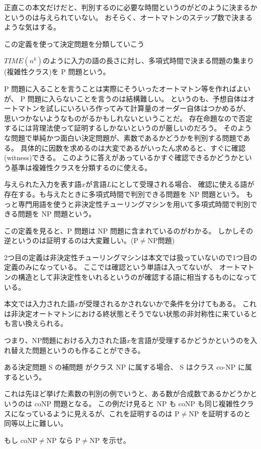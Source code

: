 \documentclass[../../master.tex]{subfiles}
\begin{document}
正直この本文だけだと、判別するのに必要な時間というのがどのように決まるかというのは与えられていない。
おそらく、オートマトンのステップ数で決まるような気はする。

この定義を使って決定問題を分類していこう
\begin{tcolorbox}[title = P 問題]
    \(TIME(n^k)\)のように入力の語の長さに対し、多項式時間で決まる問題の集まり(複雑性クラス)を P 問題という。
\end{tcolorbox}

P 問題に入ることを言うことは実際にそういったオートマトン等を作ればよいが、
P 問題に入らないことを言うのは結構難しい。
というのも、予想自体はオートマトンを試しにいろいろ作ってみて計算量のオーダー自体はつかめるが、
思いつかないようなものがるかもしれないということだ。
存在命題なので否定するには背理法使って証明するしかないというのが厳しいのだろう。
そのような問題で単純かつ面白い決定問題が、素数であるかどうかを判別する問題である。
具体的に因数を求めるのは大変であるがいったん求めると、すぐに確認(witness)できる。
このように答えがあっているかすぐ確認できるかどうかという基準は複雑性クラスを分類するのに使える。

\begin{tcolorbox}[title = NP 問題]
    与えられた入力を表す語\(x\)が言語\(L\)にとして受理される場合、
    確認に使える語が存在する。も与えたときに多項式時間で判別できる問題を NP 問題という。
    もっと専門用語を使うと非決定性チューリングマシンを用いて多項式時間で判別できる問題を NP 問題という。
\end{tcolorbox}
この定義を見ると、P 問題は NP 問題に含まれているのがわかる。
しかしその逆というのは証明するのは大変難しい。(P\(\neq\)NP問題)

2つ目の定義は非決定性チューリングマシンは本文では扱っていないので1つ目の定義のみになっている。
ここでは確認という単語は入ってないが、
オートマトンの構造として非決定性をいれるというのが確認する語に相当するものになっている。

本文では入力された語\(x\)が受理されるかされないかで条件を分けてもある。
これは非決定オートマトンにおける終状態とそうでない状態の非対称性に来ているとも言い換えられる。

つまり、NP問題における入力された語\(x\)を言語が受理するかどうかというのを入れ替えた問題というのも作ることができる。
\begin{tcolorbox}[title = coNP 問題]
    ある決定問題 S の補問題 がクラス NP に属する場合、 S はクラス co-NP に属するという。
\end{tcolorbox}
これは先ほど挙げた素数の判別の例でいうと、ある数が合成数であるかどうかというのは coNP 問題となる。
この例だけ見ると NP も coNP も同じ複雑性クラスになっているように見えるが、これを証明するのは P\(\neq\)NP を証明するのと同等以上に難しい。

\begin{tcolorbox}[title = Excercise 3.18]
    もし coNP\(\neq\)NP なら P\(\neq\)NP を示せ。
\end{tcolorbox}
\end{document}
